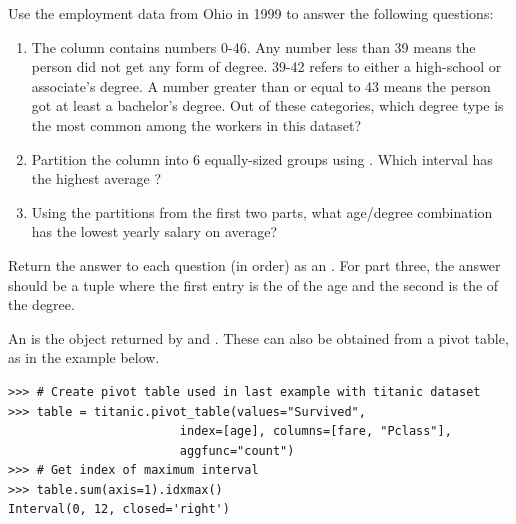 \begin{problem}
Use the employment data from Ohio in 1999 to answer the following questions:

\begin{enumerate}
\item The column  contains numbers 0-46.
Any number less than 39 means the person did not get any form of degree.
39-42 refers to either a high-school or associate's degree.
A number greater than or equal to 43 means the person got at least a bachelor's degree.
Out of these categories, which degree type is the most common among the workers in this dataset?

\item Partition the  column into 6 equally-sized groups using .
Which interval has the highest average ?

\item Using the partitions from the first two parts, what age/degree combination has the lowest yearly salary on average?
\end{enumerate}

Return the answer to each question (in order) as an .
For part three, the answer should be a tuple where the first entry is the  of the age and the second is the  of the degree.

An  is the object returned by  and .
These can also be obtained from a pivot table, as in the example below.

\begin{lstlisting}
>>> # Create pivot table used in last example with titanic dataset
>>> table = titanic.pivot_table(values="Survived",
                        index=[age], columns=[fare, "Pclass"],
                        aggfunc="count")
>>> # Get index of maximum interval
>>> table.sum(axis=1).idxmax()
Interval(0, 12, closed='right')

\end{lstlisting}
\end{problem}

